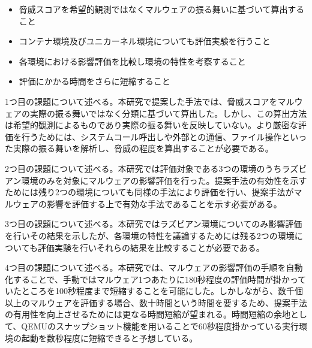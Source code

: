 \documentclass[12pt,a4paper,titlepage,report]{jsbook}
\begin{document}
\begin{itemize}
	\item 脅威スコアを希望的観測ではなくマルウェアの振る舞いに基づいて算出すること
	\item コンテナ環境及びユニカーネル環境についても評価実験を行うこと
	\item 各環境における影響評価を比較し環境の特性を考察すること
	\item 評価にかかる時間をさらに短縮すること
\end{itemize}

1つ目の課題について述べる。本研究で提案した手法では、脅威スコアをマルウェアの実際の振る舞いではなく分類に基づいて算出した。しかし、この算出方法は希望的観測によるものであり実際の振る舞いを反映していない。より厳密な評価を行うためには、システムコール呼出しや外部との通信、ファイル操作といった実際の振る舞いを解析し、脅威の程度を算出することが必要である。

2つ目の課題について述べる。本研究では評価対象である3つの環境のうちラズビアン環境のみを対象にマルウェアの影響評価を行った。提案手法の有効性を示すためには残り2つの環境についても同様の手法により評価を行い、提案手法がマルウェアの影響を評価する上で有効な手法であることを示す必要がある。

3つ目の課題について述べる。本研究ではラズビアン環境についてのみ影響評価を行いその結果を示したが、各環境の特性を議論するためには残る2つの環境についても評価実験を行いそれらの結果を比較することが必要である。

4つ目の課題について述べる。本研究では、マルウェアの影響評価の手順を自動化することで、手動ではマルウェア1つあたりに180秒程度の評価時間が掛かっていたところを100秒程度まで短縮することを可能にした。しかしながら、数千個以上のマルウェアを評価する場合、数十時間という時間を要するため、提案手法の有用性を向上させるためには更なる時間短縮が望まれる。時間短縮の余地として、QEMUのスナップショット機能を用いることで60秒程度掛かっている実行環境の起動を数秒程度に短縮できると予想している。



\end{document}
